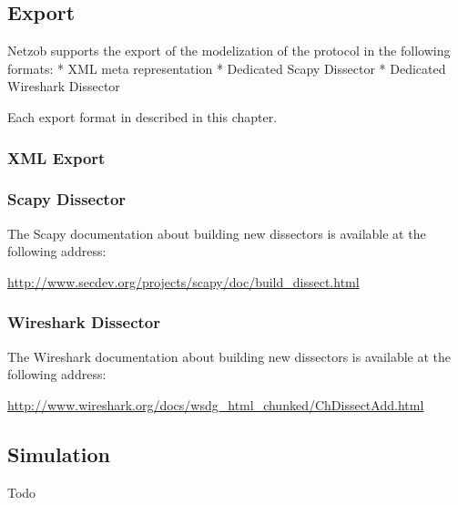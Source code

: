 \documentclass[letterpaper,10pt,english]{sphinxmanual}
\begin{document}
\subsection{Export}
\label{export/index:export}\label{export/index::doc}\label{export/index:id1}
Netzob supports the export of the modelization of the protocol in the following formats:
* XML meta representation
* Dedicated Scapy Dissector
* Dedicated Wireshark Dissector

Each export format in described in this chapter.


\subsubsection{XML Export}
\label{export/index:xml-export}

\subsubsection{Scapy Dissector}
\label{export/index:scapy-dissector}
The Scapy documentation about building new dissectors is available at the following address:

\href{http://www.secdev.org/projects/scapy/doc/build\_dissect.html}{http://www.secdev.org/projects/scapy/doc/build\_dissect.html}


\subsubsection{Wireshark Dissector}
\label{export/index:wireshark-dissector}
The Wireshark documentation about building new dissectors is available at the following address:

\href{http://www.wireshark.org/docs/wsdg\_html\_chunked/ChDissectAdd.html}{http://www.wireshark.org/docs/wsdg\_html\_chunked/ChDissectAdd.html}


\subsection{Simulation}
\label{simulation/index:id1}\label{simulation/index::doc}\label{simulation/index:simulation}
Todo
\end{document}

